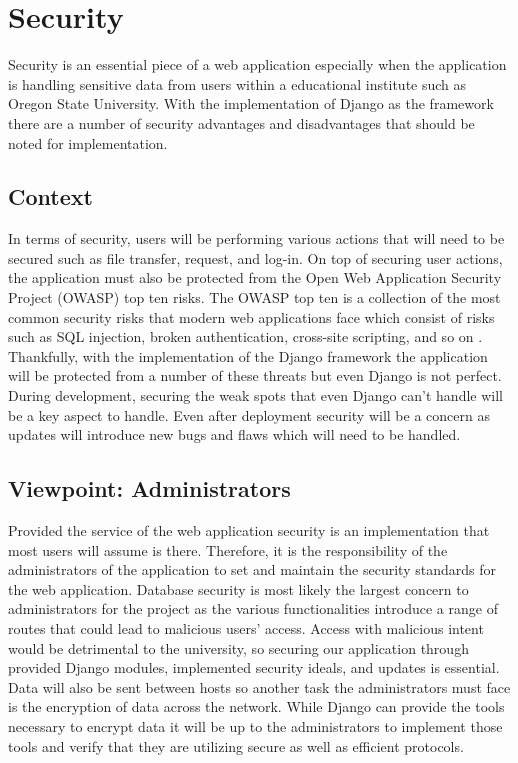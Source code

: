 \documentclass[onecolumn, draftclsnofoot,10pt, compsoc]{IEEEtran}
\begin{document}
\section{Security}
Security is an essential piece of a web application especially when the application is handling sensitive data from users within a educational institute such as Oregon State University. With the implementation of Django as the framework there are a number of security advantages and disadvantages that should be noted for implementation. 

\subsection{Context}   
In terms of security, users will be performing various actions that will need to be secured such as file transfer, request, and log-in. On top of securing user actions, the application must also be protected from the Open Web Application Security Project (OWASP) top ten risks. The OWASP top ten is a collection of the most common security risks that modern web applications face which consist of risks such as SQL injection, broken authentication, cross-site scripting, and so on \cite{owasp}. Thankfully, with the implementation of the Django framework the application will be protected from a number of these threats but even Django is not perfect. During development, securing the weak spots that even Django can’t handle will be a key aspect to handle. Even after deployment security will be a concern as updates will introduce new bugs and flaws which will need to be handled. 

\subsection{Viewpoint: Administrators}
Provided the service of the web application security is an implementation that most users will assume is there. Therefore, it is the responsibility of the administrators of the application to set and maintain the security standards for the web application. Database security is most likely the largest concern to administrators for the project as the various functionalities introduce a range of routes that could lead to malicious users’ access. Access with malicious intent would be detrimental to the university, so securing our application through provided Django modules, implemented security ideals, and updates is essential. Data will also be sent between hosts so another task the administrators must face is the encryption of data across the network. While Django can provide the tools necessary to encrypt data it will be up to the administrators to implement  those tools and verify that they are utilizing secure as well as efficient protocols. 
\end{document}

